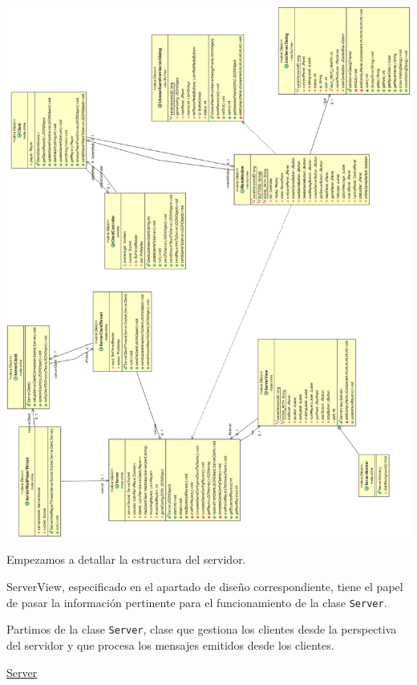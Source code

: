 \documentclass[12pt,a4paper,openright]{book}
\theoremstyle{break}
\begin{document}
\begin{center}
\includegraphics[scale=0.45]{UMLClasesRedSprint7.png} 
\end{center}

Empezamos a detallar la estructura del servidor.

ServerView, especificado en el apartado de diseño correspondiente, tiene el papel de pasar la información pertinente para el funcionamiento de la clase \texttt{Server}.

Partimos de la clase \texttt{Server}, clase que gestiona los clientes desde la perspectiva del servidor y que procesa los mensajes emitidos desde los clientes.

\newpage

\underline{Server}
\end{document}
